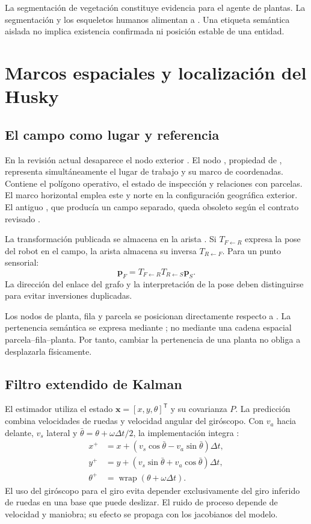 La segmentación de vegetación constituye evidencia para el agente de plantas. La segmentación y los esqueletos humanos alimentan a . Una etiqueta semántica aislada no implica existencia confirmada ni posición estable de una entidad.

\section{Marcos espaciales y localización del Husky}
\subsection{El campo como lugar y referencia}
En la revisión actual desaparece el nodo exterior . El nodo , propiedad de , representa simultáneamente el lugar de trabajo y su marco de coordenadas. Contiene el polígono operativo, el estado de inspección y relaciones con parcelas. El marco horizontal emplea este y norte en la configuración geográfica exterior. El antiguo , que producía un campo separado, queda obsoleto según el contrato revisado \cite{conceptos}.

La transformación publicada se almacena en la arista . Si $T_{F\leftarrow R}$ expresa la pose del robot en el campo, la arista almacena su inversa $T_{R\leftarrow F}$. Para un punto sensorial:
\begin{equation}
\mathbf p_F=T_{F\leftarrow R}T_{R\leftarrow S}\mathbf p_S.
\end{equation}
La dirección del enlace del grafo y la interpretación de la pose deben distinguirse para evitar inversiones duplicadas.

Los nodos de planta, fila y parcela se posicionan directamente respecto a . La pertenencia semántica se expresa mediante ; no mediante una cadena espacial parcela--fila--planta. Por tanto, cambiar la pertenencia de una planta no obliga a desplazarla físicamente.

\subsection{Filtro extendido de Kalman}
El estimador utiliza el estado $\mathbf x=[x,y,\theta]^\mathsf T$ y su covarianza $P$. La predicción combina velocidades de ruedas y velocidad angular del giróscopo. Con $v_a$ hacia delante, $v_s$ lateral y $\bar\theta=\theta+\omega\Delta t/2$, la implementación integra \cite{ekf}:
\begin{align}
x^+&=x+(v_s\cos\bar\theta-v_a\sin\bar\theta)\Delta t,\\
y^+&=y+(v_s\sin\bar\theta+v_a\cos\bar\theta)\Delta t,\\
\theta^+&=\operatorname{wrap}(\theta+\omega\Delta t).
\end{align}
El uso del giróscopo para el giro evita depender exclusivamente del giro inferido de ruedas en una base que puede deslizar. El ruido de proceso depende de velocidad y maniobra; su efecto se propaga con los jacobianos del modelo.

